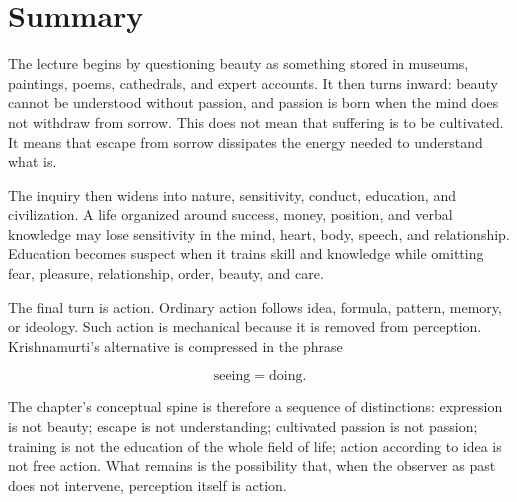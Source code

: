 \section{Summary}

The lecture begins by questioning beauty as something stored in museums, paintings, poems, cathedrals, and expert accounts. It then turns inward: beauty cannot be understood without passion, and passion is born when the mind does not withdraw from sorrow. This does not mean that suffering is to be cultivated. It means that escape from sorrow dissipates the energy needed to understand what is.

The inquiry then widens into nature, sensitivity, conduct, education, and civilization. A life organized around success, money, position, and verbal knowledge may lose sensitivity in the mind, heart, body, speech, and relationship. Education becomes suspect when it trains skill and knowledge while omitting fear, pleasure, relationship, order, beauty, and care.

The final turn is action. Ordinary action follows idea, formula, pattern, memory, or ideology. Such action is mechanical because it is removed from perception. Krishnamurti's alternative is compressed in the phrase

\begin{equation}
\text{seeing} = \text{doing}.
\end{equation}

The chapter's conceptual spine is therefore a sequence of distinctions: expression is not beauty; escape is not understanding; cultivated passion is not passion; training is not the education of the whole field of life; action according to idea is not free action. What remains is the possibility that, when the observer as past does not intervene, perception itself is action.